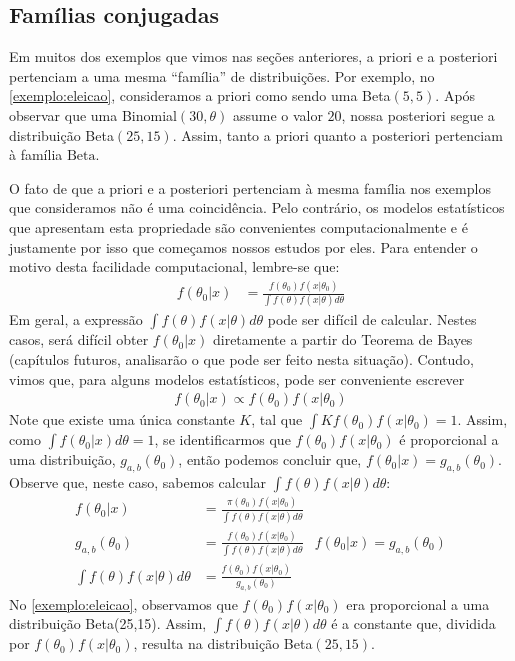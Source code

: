 

\subsection{Famílias conjugadas}

Em muitos dos exemplos que vimos nas seções anteriores,
a priori e a posteriori pertenciam a uma mesma
``família'' de distribuições.
Por exemplo, no \cref{exemplo:eleicao},
consideramos a priori como sendo uma Beta$(5,5)$.
Após observar que uma Binomial$(30,\theta)$ assume o
valor $20$, nossa posteriori segue a
distribuição Beta$(25,15)$. Assim,
tanto a priori quanto a posteriori pertenciam à
família $\text{Beta}$.

O fato de que a priori e a posteriori pertenciam à
mesma família nos exemplos que consideramos não é
uma coincidência. Pelo contrário, os
modelos estatísticos que apresentam esta propriedade são
convenientes computacionalmente e é
justamente por isso que começamos
nossos estudos por eles.
Para entender o motivo desta facilidade computacional,
lembre-se que:
\begin{align*}
 f(\theta_{0}|x)
 &= \frac{f(\theta_{0})f(x|\theta_{0})}
 {\int{f(\theta)f(x|\theta)d\theta}}
\end{align*}
Em geral, a expressão
$\int{f(\theta)f(x|\theta)d\theta}$
pode ser difícil de calcular.
Nestes casos, será difícil obter
$f(\theta_{0}|x)$ diretamente a partir do
Teorema de Bayes (capítulos futuros, analisarão 
o que pode ser feito nesta situação).
Contudo, vimos que, para alguns modelos estatísticos,
pode ser conveniente escrever
\begin{align*}
 f(\theta_{0}|x) \propto f(\theta_{0})f(x|\theta_{0})
\end{align*}
Note que existe uma única constante $K$, tal que 
$\int{Kf(\theta_{0})f(x|\theta_{0})} = 1$.
Assim, como $\int{f(\theta_{0}|x)d\theta}=1$,
se identificarmos que $f(\theta_{0})f(x|\theta_{0})$
é proporcional a uma distribuição,
$g_{a,b}(\theta_{0})$, então podemos concluir que, $f(\theta_{0}|x) =  g_{a,b}(\theta_{0})$.
Observe que, neste caso, sabemos calcular $\int{f(\theta)f(x|\theta)d\theta}$:
\begin{align*}
 f(\theta_{0}|x) 
 &= \frac{\pi(\theta_{0})f(x|\theta_{0})}
 {\int{f(\theta)f(x|\theta)d\theta}} \\
 g_{a,b}(\theta_{0})
 &= \frac{f(\theta_{0})f(x|\theta_{0})}
 {\int{f(\theta)f(x|\theta)d\theta}}
 & f(\theta_{0}|x) = g_{a,b}(\theta_{0}) \\
 \int{f(\theta)f(x|\theta)d\theta}
 &= \frac{f(\theta_{0})f(x|\theta_{0})}
 {g_{a,b}(\theta_{0})}
\end{align*}
No \cref{exemplo:eleicao}, observamos que
$f(\theta_{0})f(x|\theta_{0})$ era
proporcional a uma distribuição Beta(25,15).
Assim, $\int{f(\theta)f(x|\theta)d\theta}$ é
a constante que, dividida por $f(\theta_{0})f(x|\theta_{0})$,
resulta na distribuição Beta$(25,15)$.

